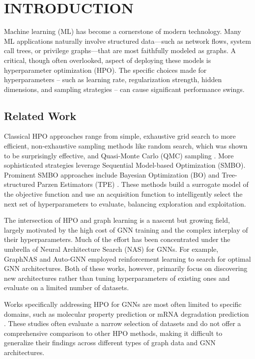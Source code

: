 \section{\uppercase{Introduction}}

Machine learning (ML) has become a cornerstone of modern technology. Many ML applications naturally involve structured data—such as network flows, system call trees, or privilege graphs—that are most faithfully modeled as graphs. A critical, though often overlooked, aspect of deploying these models is hyperparameter optimization (HPO). The specific choices made for hyperparameters -- such as learning rate, regularization strength, hidden dimensions, and sampling strategies -- can cause significant performance swings.

\subsection{Related Work}\label{sec:related-work}

Classical HPO approaches range from simple, exhaustive grid search to more efficient, non-exhaustive sampling methods like random search, which was shown to be surprisingly effective, and Quasi-Monte Carlo (QMC) sampling \cite{bergstra_random_2012}. More sophisticated strategies leverage Sequential Model-based Optimization (SMBO). Prominent SMBO approaches include Bayesian Optimization (BO) and Tree-structured Parzen Estimators (TPE) \cite{bergstra_algorithms_2011}. These methods build a surrogate model of the objective function and use an acquisition function to intelligently select the next set of hyperparameters to evaluate, balancing exploration and exploitation.

The intersection of HPO and graph learning is a nascent but growing field, largely motivated by the high cost of GNN training and the complex interplay of their hyperparameters. Much of the effort has been concentrated under the umbrella of Neural Architecture Search (NAS) for GNNs. For example, GraphNAS \cite{gao_graph_2020} and Auto-GNN \cite{zhou_auto-gnn_2022} employed reinforcement learning to search for optimal GNN architectures. Both of these works, however, primarily focus on discovering new architectures rather than tuning hyperparameters of existing ones and evaluate on a limited number of datasets.

Works specifically addressing HPO for GNNs are most often limited to specific domains, such as molecular property prediction \cite{yuan_genetic_2021, yuan_systematic_2021, yuan_which_2021, ebadi_hyperparameter_2025} or mRNA degradation prediction \cite{vodilovska_hyperparameter_2023}. These studies often evaluate a narrow selection of datasets and do not offer a comprehensive comparison to other HPO methods, making it difficult to generalize their findings across different types of graph data and GNN architectures.

